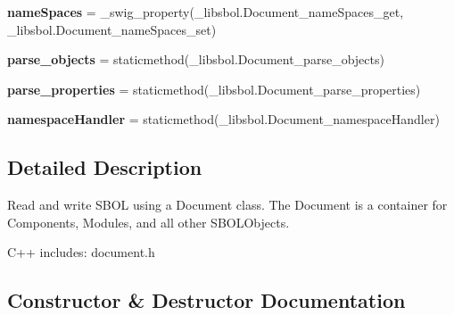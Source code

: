 \begin{DoxyCompactItemize}
\item 
{\bfseries name\+Spaces} = \+\_\+swig\+\_\+property(\+\_\+libsbol.\+Document\+\_\+name\+Spaces\+\_\+get, \+\_\+libsbol.\+Document\+\_\+name\+Spaces\+\_\+set)\hypertarget{classsbol_1_1libsbol_1_1_document_aacd9264b848f38f76d1ce1993335c8c7}{}\label{classsbol_1_1libsbol_1_1_document_aacd9264b848f38f76d1ce1993335c8c7}

\item 
{\bfseries parse\+\_\+objects} = staticmethod(\+\_\+libsbol.\+Document\+\_\+parse\+\_\+objects)\hypertarget{classsbol_1_1libsbol_1_1_document_ad9fe00e8c9dab72eed42c9e57ef05ad0}{}\label{classsbol_1_1libsbol_1_1_document_ad9fe00e8c9dab72eed42c9e57ef05ad0}

\item 
{\bfseries parse\+\_\+properties} = staticmethod(\+\_\+libsbol.\+Document\+\_\+parse\+\_\+properties)\hypertarget{classsbol_1_1libsbol_1_1_document_af1be03e32077c89cec540b16c890eddf}{}\label{classsbol_1_1libsbol_1_1_document_af1be03e32077c89cec540b16c890eddf}

\item 
{\bfseries namespace\+Handler} = staticmethod(\+\_\+libsbol.\+Document\+\_\+namespace\+Handler)\hypertarget{classsbol_1_1libsbol_1_1_document_a30a2303398162f5df252afc155fbd517}{}\label{classsbol_1_1libsbol_1_1_document_a30a2303398162f5df252afc155fbd517}

\end{DoxyCompactItemize}


\subsection{Detailed Description}
\begin{DoxyVerb}Read and write SBOL using a Document class. The Document is a
container for Components, Modules, and all other SBOLObjects.

C++ includes: document.h 
\end{DoxyVerb}
 

\subsection{Constructor \& Destructor Documentation}
